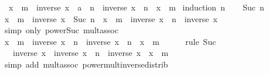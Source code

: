 \begin{isabellebody}
\ \ {\isachardoublequoteopen}x\ {\isacharcircum}{\kern0pt}\ m\ {\isacharasterisk}{\kern0pt}\ inverse\ {\isacharparenleft}{\kern0pt}x\ {\isacharcolon}{\kern0pt}{\isacharcolon}{\kern0pt}\ {\isacharprime}{\kern0pt}a{\isacharparenright}{\kern0pt}\ {\isacharcircum}{\kern0pt}\ n\ {\isacharequal}{\kern0pt}\ inverse\ x\ {\isacharcircum}{\kern0pt}\ n\ {\isacharasterisk}{\kern0pt}\ x\ {\isacharcircum}{\kern0pt}\ m{\isachardoublequoteclose}\isanewline
%
\isadelimproof
%
\endisadelimproof
%
\isatagproof
{}\isamarkupfalse%
\ {\isacharparenleft}{\kern0pt}induction\ n{\isacharparenright}{\kern0pt}\isanewline
\ \ \isamarkupfalse%
\ {\isacharparenleft}{\kern0pt}Suc\ n{\isacharparenright}{\kern0pt}\isanewline
\ \ \isamarkupfalse%
\ {\isachardoublequoteopen}x\ {\isacharcircum}{\kern0pt}\ m\ {\isacharasterisk}{\kern0pt}\ inverse\ x\ {\isacharcircum}{\kern0pt}\ Suc\ n\ {\isacharequal}{\kern0pt}\ {\isacharparenleft}{\kern0pt}x\ {\isacharcircum}{\kern0pt}\ m\ {\isacharasterisk}{\kern0pt}\ inverse\ x\ {\isacharcircum}{\kern0pt}\ n{\isacharparenright}{\kern0pt}\ {\isacharasterisk}{\kern0pt}\ inverse\ x{\isachardoublequoteclose}\isanewline
\ \ \ \ \isamarkupfalse%
\ {\isacharparenleft}{\kern0pt}simp\ only{\isacharcolon}{\kern0pt}\ power{\isacharunderscore}{\kern0pt}Suc{}\ mult{\isachardot}{\kern0pt}assoc{\isacharparenright}{\kern0pt}\isanewline
\ \ \isamarkupfalse%
\ \isamarkupfalse%
\ {\isachardoublequoteopen}x\ {\isacharcircum}{\kern0pt}\ m\ {\isacharasterisk}{\kern0pt}\ inverse\ x\ {\isacharcircum}{\kern0pt}\ n\ {\isacharequal}{\kern0pt}\ inverse\ x\ {\isacharcircum}{\kern0pt}\ n\ {\isacharasterisk}{\kern0pt}\ x\ {\isacharcircum}{\kern0pt}\ m{\isachardoublequoteclose}\isanewline
\ \ \ \ \isamarkupfalse%
\ {\isacharparenleft}{\kern0pt}rule\ Suc{\isacharparenright}{\kern0pt}\isanewline
\ \ \isamarkupfalse%
\ \isamarkupfalse%
\ {\isachardoublequoteopen}{\isasymdots}\ {\isacharasterisk}{\kern0pt}\ inverse\ x\ {\isacharequal}{\kern0pt}\ {\isacharparenleft}{\kern0pt}inverse\ x\ {\isacharcircum}{\kern0pt}\ n\ {\isacharasterisk}{\kern0pt}\ inverse\ x{\isacharparenright}{\kern0pt}\ {\isacharasterisk}{\kern0pt}\ x\ {\isacharcircum}{\kern0pt}\ m{\isachardoublequoteclose}\isanewline
\ \ \ \ \isamarkupfalse%
\ {\isacharparenleft}{\kern0pt}simp\ add{\isacharcolon}{\kern0pt}\ mult{\isachardot}{\kern0pt}assoc\ power{\isacharunderscore}{\kern0pt}mult{\isacharunderscore}{\kern0pt}inverse{\isacharunderscore}{\kern0pt}distrib{\isacharparenright}{\kern0pt}\isanewline

\end{isabellebody}
